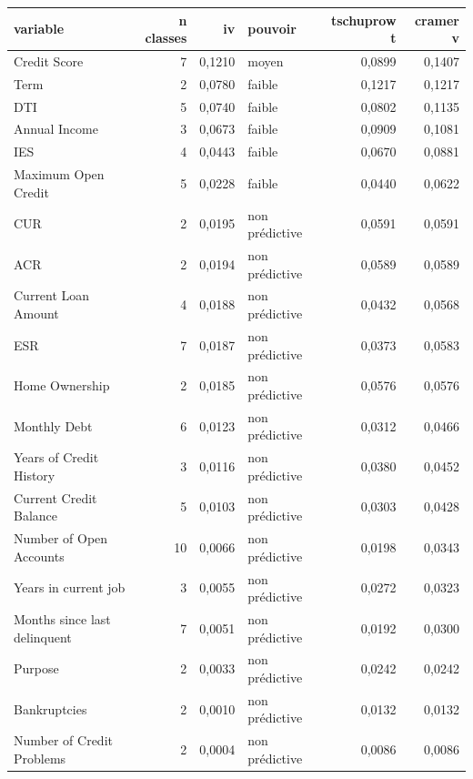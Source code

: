 \begin{tabular}{lrrlrr}
\toprule
\textbf{variable} & \textbf{n classes} & \textbf{iv} & \textbf{pouvoir} & \textbf{tschuprow t} & \textbf{cramer v} \\
\midrule
Credit Score & 7 & 0,1210 & moyen & 0,0899 & 0,1407 \\
Term & 2 & 0,0780 & faible & 0,1217 & 0,1217 \\
DTI & 5 & 0,0740 & faible & 0,0802 & 0,1135 \\
Annual Income & 3 & 0,0673 & faible & 0,0909 & 0,1081 \\
IES & 4 & 0,0443 & faible & 0,0670 & 0,0881 \\
Maximum Open Credit & 5 & 0,0228 & faible & 0,0440 & 0,0622 \\
CUR & 2 & 0,0195 & non prédictive & 0,0591 & 0,0591 \\
ACR & 2 & 0,0194 & non prédictive & 0,0589 & 0,0589 \\
Current Loan Amount & 4 & 0,0188 & non prédictive & 0,0432 & 0,0568 \\
ESR & 7 & 0,0187 & non prédictive & 0,0373 & 0,0583 \\
Home Ownership & 2 & 0,0185 & non prédictive & 0,0576 & 0,0576 \\
Monthly Debt & 6 & 0,0123 & non prédictive & 0,0312 & 0,0466 \\
Years of Credit History & 3 & 0,0116 & non prédictive & 0,0380 & 0,0452 \\
Current Credit Balance & 5 & 0,0103 & non prédictive & 0,0303 & 0,0428 \\
Number of Open Accounts & 10 & 0,0066 & non prédictive & 0,0198 & 0,0343 \\
Years in current job & 3 & 0,0055 & non prédictive & 0,0272 & 0,0323 \\
Months since last delinquent & 7 & 0,0051 & non prédictive & 0,0192 & 0,0300 \\
Purpose & 2 & 0,0033 & non prédictive & 0,0242 & 0,0242 \\
Bankruptcies & 2 & 0,0010 & non prédictive & 0,0132 & 0,0132 \\
Number of Credit Problems & 2 & 0,0004 & non prédictive & 0,0086 & 0,0086 \\
\bottomrule
\end{tabular}
